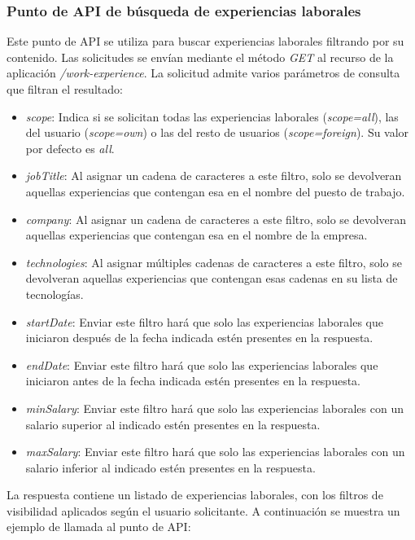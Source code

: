 \documentclass[a4paper, 12pt]{book}
\begin{document}
    \subsubsection{Punto de API de búsqueda de experiencias laborales}
    \label{subsec:get_work_experience}
    Este punto de API se utiliza para buscar experiencias laborales filtrando por su contenido.
    Las solicitudes se envían mediante el método \emph{GET} al recurso de la aplicación \emph{/work-experience}.
    La solicitud admite varios parámetros de consulta que filtran el resultado:
    \begin{itemize}
        \item \emph{scope}: Indica si se solicitan todas las experiencias laborales (\emph{scope=all}), las del usuario (\emph{scope=own}) o las del resto de usuarios (\emph{scope=foreign}).
        Su valor por defecto es \emph{all}.
        \item \emph{jobTitle}: Al asignar un cadena de caracteres a este filtro, solo se devolveran aquellas experiencias que contengan esa en el nombre del puesto de trabajo.
        \item \emph{company}: Al asignar un cadena de caracteres a este filtro, solo se devolveran aquellas experiencias que contengan esa en el nombre de la empresa.
        \item \emph{technologies}: Al asignar múltiples cadenas de caracteres a este filtro, solo se devolveran aquellas experiencias que contengan esas cadenas en su lista de tecnologías.
        \item \emph{startDate}: Enviar este filtro hará que solo las experiencias laborales que iniciaron después de la fecha indicada estén presentes en la respuesta.
        \item \emph{endDate}: Enviar este filtro hará que solo las experiencias laborales que iniciaron antes de la fecha indicada estén presentes en la respuesta.
        \item \emph{minSalary}: Enviar este filtro hará que solo las experiencias laborales con un salario superior al indicado estén presentes en la respuesta.
        \item \emph{maxSalary}: Enviar este filtro hará que solo las experiencias laborales con un salario inferior al indicado estén presentes en la respuesta.
    \end{itemize}
    La respuesta contiene un listado de experiencias laborales, con los filtros de visibilidad aplicados según el usuario solicitante.
    A continuación se muestra un ejemplo de llamada al punto de API:
\end{document}

